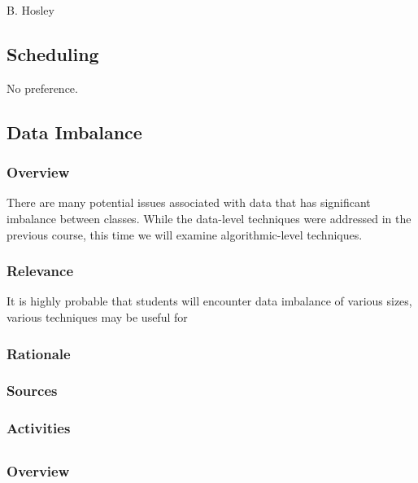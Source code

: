 \documentclass[12pt]{amsart}
\begin{document}
\raggedbottom

\hspace{\fill} {\large B. Hosley}
\bigskip


\subsection{Scheduling}

No preference. \\

\subsection{Data Imbalance}

\subsubsection{Overview}
There are many potential issues associated with data that has significant imbalance between classes. 
While the data-level techniques were addressed in the previous course, 
this time we will examine algorithmic-level techniques.

\subsubsection{Relevance}
It is highly probable that students will encounter data imbalance of various sizes,
various techniques may be useful for 

\subsubsection{Rationale}
\subsubsection{Sources}
\subsubsection{Activities}



\subsection{}
\subsubsection{Overview}
\end{document}
